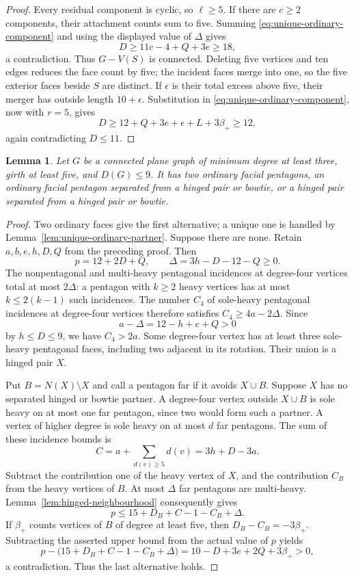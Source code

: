 \documentclass[11pt]{article}
\newtheorem{lemma}[theorem]{Lemma}
\theoremstyle{remark}
\numberwithin{equation}{section}
\numberwithin{table}{section}
\begin{document}
\begin{proof}
Every residual component is cyclic, so $\ell\ge5$. If there are
$c\ge2$ components, their attachment counts sum to five. Summing
\eqref{eq:unique-ordinary-component} and using the displayed value
of $\Delta$ gives
\[
 D\ge11c-4+Q+3e\ge18,
\]
a contradiction. Thus $G-V(S)$ is connected. Deleting five vertices
and ten edges reduces the face count by five; the incident faces merge
into one, so the five exterior faces beside $S$ are distinct. If
$\epsilon$ is their total excess above five, their merger has outside
length $10+\epsilon$. Substitution in
\eqref{eq:unique-ordinary-component}, now with $r=5$, gives
\[
 D\ge12+Q+3e+\epsilon+L+3\beta_+\ge12,
\]
again contradicting $D\le11$.
\end{proof}

\begin{lemma}\label{lem:small-excess-structure}
Let $G$ be a connected plane graph of minimum degree at least three,
girth at least five, and $D(G)\le9$. It has two ordinary facial
pentagons, an ordinary facial pentagon separated from a hinged pair
or bowtie, or a hinged pair separated from a hinged pair or bowtie.
\end{lemma}
\begin{proof}
Two ordinary faces give the first alternative; a unique one is handled
by Lemma~\ref{lem:unique-ordinary-partner}. Suppose there are none.
Retain $a,b,e,h,D,Q$ from the preceding proof. Then
\[
 p=12+2D+Q,\qquad \Delta=3h-D-12-Q\ge0.
\]
The nonpentagonal and multi-heavy pentagonal incidences at degree-four
vertices total at most $2\Delta$: a pentagon with $k\ge2$ heavy
vertices has at most $k\le2(k-1)$ such incidences. The number $C_4$
of sole-heavy pentagonal incidences at degree-four vertices therefore
satisfies $C_4\ge4a-2\Delta$. Since
\[
 a-\Delta=12-h+e+Q>0
\]
by $h\le D\le9$, we have $C_4>2a$. Some degree-four vertex has at
least three sole-heavy pentagonal faces, including two adjacent in
its rotation. Their union is a hinged pair $X$.

Put $B=N(X)\setminus X$ and call a pentagon far if it avoids $X\cup B$.
Suppose $X$ has no separated hinged or bowtie partner. A degree-four
vertex outside $X\cup B$ is sole heavy on at most one far pentagon,
since two would form such a partner. A vertex of higher degree is sole heavy on at most $d$ far pentagons.
The sum of these incidence bounds is
\[
 C=a+\sum_{d(v)\ge5}d(v)=3h+D-3a.
\]
Subtract the contribution one of the heavy vertex of $X$, and the
contribution $C_B$ from the heavy vertices of $B$. At most $\Delta$ far pentagons are
multi-heavy. Lemma~\ref{lem:hinged-neighbourhood} consequently gives
\[
 p\le15+D_B+C-1-C_B+\Delta.
\]
If $\beta_+$ counts vertices of $B$ of degree at least five, then
$D_B-C_B=-3\beta_+$. Subtracting the asserted upper bound from the
actual value of $p$ yields
\[
 p-\bigl(15+D_B+C-1-C_B+\Delta\bigr)
   =10-D+3e+2Q+3\beta_+>0,
\]
a contradiction. Thus the last alternative holds.
\end{proof}
\end{document}
